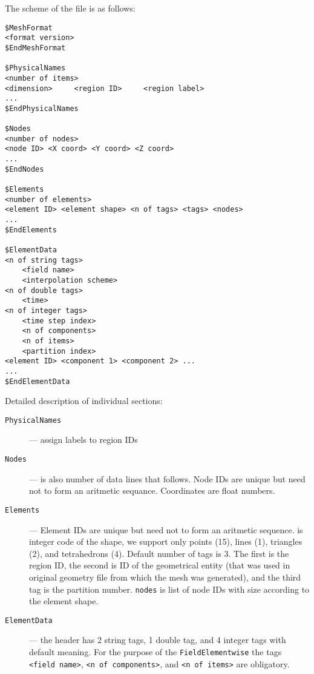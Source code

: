 The scheme of the file is as follows:
\begin{verbatim}
$MeshFormat
<format version>
$EndMeshFormat

$PhysicalNames
<number of items>
<dimension>     <region ID>     <region label>
...
$EndPhysicalNames

$Nodes
<number of nodes>
<node ID> <X coord> <Y coord> <Z coord>
...
$EndNodes

$Elements
<number of elements>
<element ID> <element shape> <n of tags> <tags> <nodes>
...
$EndElements

$ElementData
<n of string tags>
    <field name>
    <interpolation scheme>
<n of double tags>
    <time>
<n of integer tags>
    <time step index>
    <n of components>
    <n of items>
    <partition index>
<element ID> <component 1> <component 2> ...
...
$EndElementData
\end{verbatim}
Detailed description of individual sections:
\begin{description}
 \item[{\tt PhysicalNames}] --- assign labels to region IDs
 \item[{\tt Nodes}] --- {\tt <number of nodes>} is also number of data lines that follows. 
    Node IDs are unique but need not to form an aritmetic sequance. Coordinates are float numbers.
 \item[{\tt Elements}] --- Element IDs are unique but need not to form an aritmetic sequence. 
    {\tt <element shape>} is integer code of the shape, we support only points (15), lines (1), triangles (2), and tetrahedrons (4).
    Default number of tags is 3. The first is the region ID, the second is ID of the geometrical entity (that was used in original geometry file from which the mesh was generated),
    and the third tag is the partition number. {\tt nodes} is list of node IDs with size according to the element shape.
 \item[{\tt ElementData}] --- the header has 2 string tags, 1 double tag, and 4 integer tags with default meaning. For the purpose of the \verb'FieldElementwise' the tags
    \verb'<field name>', \verb'<n of components>', and \verb'<n of items>' are obligatory.
\end{description}


